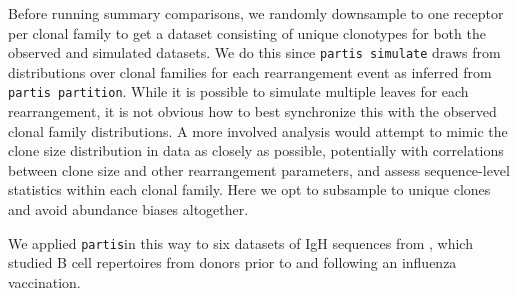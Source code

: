 \documentclass{article}
\newcommand{\partis}{\texttt{partis}}
\begin{document}
Before running summary comparisons, we randomly downsample to one receptor per clonal family to get a dataset consisting of unique clonotypes for both the observed and simulated datasets.
We do this since \texttt{partis simulate} draws from distributions over clonal families for each rearrangement event as inferred from \texttt{partis partition}.
While it is possible to simulate multiple leaves for each rearrangement, it is not obvious how to best synchronize this with the observed clonal family distributions.
A more involved analysis would attempt to mimic the clone size distribution in data as closely as possible, potentially with correlations between clone size and other rearrangement parameters, and assess sequence-level statistics within each clonal family.
Here we opt to subsample to unique clones and avoid abundance biases altogether.

We applied \partis in this way to six datasets of IgH sequences from \cite{Gupta2017-ve}, which studied B cell repertoires from donors prior to and following an influenza vaccination.
\end{document}
